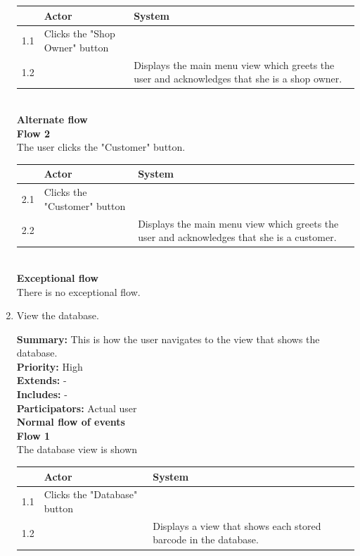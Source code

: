 \documentclass{report}
\begin{document}
\begin{enumerate}
    \begin{tabular}{ | l | p{4cm} | p{4cm} |}
    \hline
      & Actor & System \\ \hline
    1.1 & Clicks the "Shop Owner" button & \\ \hline
    1.2 & & Displays the main menu view which greets the user and acknowledges that she is a shop owner. \\
    \hline
    \end{tabular} \\

    \textbf{Alternate flow} \\
    \textbf{Flow 2} \\ The user clicks the "Customer" button. \\

    \begin{tabular}{ | l | p{4cm} | p{4cm} |}
    \hline
      & Actor & System \\ \hline
    2.1 & Clicks the "Customer" button & \\ \hline
    2.2 & & Displays the main menu view which greets the user and acknowledges that she is a customer. \\
    \hline
    \end{tabular} \\

    \textbf{Exceptional flow} \\ There is no exceptional flow.

  \item View the database. \

    \textbf{Summary:} This is how the user navigates to the view that shows the database. \\
    \textbf{Priority:} High \\
    \textbf{Extends:} - \\
    \textbf{Includes:} - \\
    \textbf{Participators:} Actual user \\
    \textbf{Normal flow of events} \\
    \textbf{Flow 1} \\ The database view is shown \\

    \begin{tabular}{ | l | p{4cm} | p{4cm} |}
    \hline
      & Actor & System \\ \hline
    1.1 & Clicks the "Database" button & \\ \hline
    1.2 & & Displays a view that shows each stored barcode in the database. \\
    \hline
    \end{tabular} \\


\end{enumerate}
\end{document}
